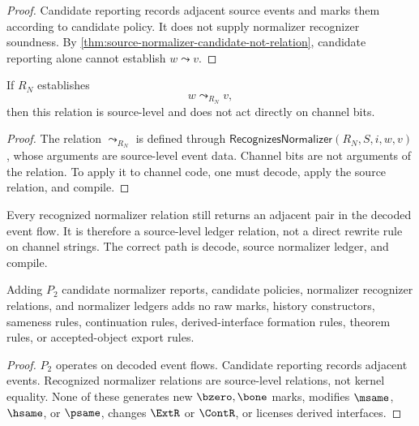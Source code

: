 \begin{proof}
Candidate reporting records adjacent source events and marks them according to candidate policy. It does not supply normalizer recognizer soundness. By \autoref{thm:source-normalizer-candidate-not-relation}, candidate reporting alone cannot establish $w\leadsto v$.
\end{proof}

\begin{theorem}
\label{thm:source-normalizer-relation-source-level}
If $R_N$ establishes
$$
  w\leadsto_{R_N}v,
$$
then this relation is source-level and does not act directly on channel bits.
\end{theorem}

\begin{proof}
The relation $\leadsto_{R_N}$ is defined through $\mathsf{RecognizesNormalizer}(R_N,S,i,w,v)$, whose arguments are source-level event data. Channel bits are not arguments of the relation. To apply it to channel code, one must decode, apply the source relation, and compile.
\end{proof}

\begin{corollary}
\label{cor:source-normalizer-no-channel-rewrite}
Every recognized normalizer relation still returns an adjacent pair in the decoded event flow. It is therefore a source-level ledger relation, not a direct rewrite rule on channel strings. The correct path is decode, source normalizer ledger, and compile.
\end{corollary}

\begin{theorem}
\label{thm:source-normalizer-p2-conservative}
Adding $P_2$ candidate normalizer reports, candidate policies, normalizer recognizer relations, and normalizer ledgers adds no raw marks, history constructors, sameness rules, continuation rules, derived-interface formation rules, theorem rules, or accepted-object export rules.
\end{theorem}

\begin{proof}
$P_2$ operates on decoded event flows. Candidate reporting records adjacent events. Recognized normalizer relations are source-level relations, not kernel equality. None of these generates new $\bzero,\bone$ marks, modifies $\msame$, $\hsame$, or $\psame$, changes $\ExtR$ or $\ContR$, or licenses derived interfaces.
\end{proof}

